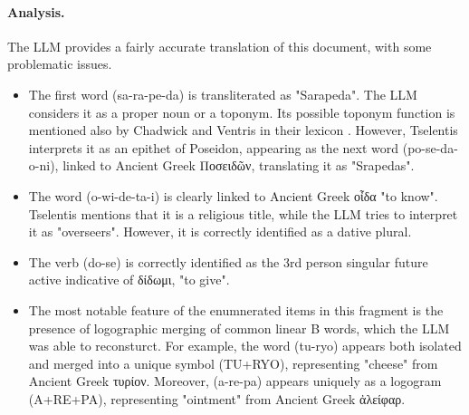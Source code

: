 \paragraph{Analysis.}
The LLM provides a fairly accurate translation of this document, with some problematic issues.
\begin{itemize}
  \item The first word \textlinb{\Bsa\Bra\Be\Bpe\Bda} (sa-ra-pe-da) is transliterated as "Sarapeda". The LLM considers it as a proper noun or a toponym. Its possible toponym function is mentioned also by Chadwick and Ventris in their lexicon \cite{chadwick-notes}.
  However, Tselentis interprets it as an epithet of Poseidon, appearing as the next word \textlinb{\Bpo\Bse\Bda\Bo\Bni} (po-se-da-o-ni), linked to Ancient Greek \textgreek{Ποσειδῶν}, translating it as "Srapedas".
  \item The word \textlinb{\Bo\Bwi\Bde\Bta\Bi} (o-wi-de-ta-i) is clearly linked to Ancient Greek \textgreek{οἶδα} "to know". Tselentis mentions that it is a religious title, while the LLM tries to interpret it as "overseers". However, it is correctly identified as a dative plural.
  \item The verb \textlinb{\Bdo\Bse} (do-se) is correctly identified as the 3rd person singular future active indicative of \textgreek{δίδωμι}, "to give".
  \item The most notable feature of the enumnerated items in this fragment is the presence of logographic merging of common linear B words, which the LLM was able to reconsturct.
  For example, the word \textlinb{\Btu\Broii} (tu-ryo) appears both isolated and merged into a unique symbol (TU+RYO), representing "cheese" from Ancient Greek \textgreek{τυρίον}. 
  Moreover, \textlinb{\Ba\Bre\Bpa} (a-re-pa) appears uniquely as a logogram (A+RE+PA), representing "ointment" from Ancient Greek \textgreek{ἀλείφαρ}.

\end{itemize}

